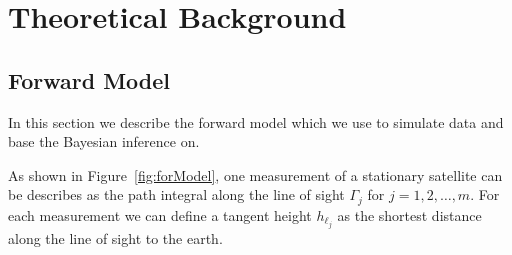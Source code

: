 \chapter{Theoretical Background}

\section{Forward Model}

\begin{figure}[ht!]
	\centering
	\scalebox{0.9}{}
	\label{fig:FirstLIMB}
\end{figure}

In this section we describe the forward model which we use to simulate data and base the Bayesian inference on.

As shown in Figure~\ref{fig:forModel}, one measurement of a stationary satellite can be describes as the path integral along the line of sight $\Gamma_j$ for $j=1,2,\ldots,m$.
For each measurement we can define a tangent height $h_{\ell_j}$ as the shortest distance along the line of sight to the earth.


